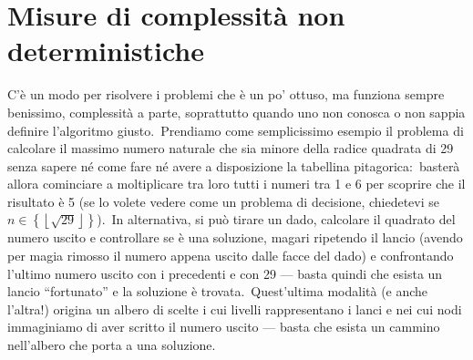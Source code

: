 \section{Misure di complessità non deterministiche}

C'è un modo per risolvere i problemi che è un po' ottuso, ma funziona sempre benissimo, complessità a parte, soprattutto quando uno non conosca o non sappia definire l'algoritmo giusto.\
Prendiamo come semplicissimo esempio il problema di calcolare il massimo numero naturale che sia minore della radice quadrata di 29 senza sapere né come fare né avere a disposizione la tabellina pitagorica:\ basterà allora cominciare a moltiplicare tra loro tutti i numeri tra 1 e 6 per scoprire che il risultato è 5 (se lo volete vedere come un problema di decisione, chiedetevi se $n \in \left\{\left\lfloor \sqrt{29}\right\rfloor\right\}$).\
In alternativa, si può tirare un dado, calcolare il quadrato del numero uscito e controllare se è una soluzione, magari ripetendo il lancio (avendo per magia rimosso il numero appena uscito dalle facce del dado) e confrontando l'ultimo numero uscito con i precedenti e con 29 --- basta quindi che esista un lancio ``fortunato'' e la soluzione è trovata.\
Quest'ultima modalità (e anche l'altra!) origina un albero di scelte i cui livelli rappresentano i lanci e nei cui nodi immaginiamo di aver scritto il numero uscito --- basta che esista un cammino nell'albero che porta a una soluzione.\

